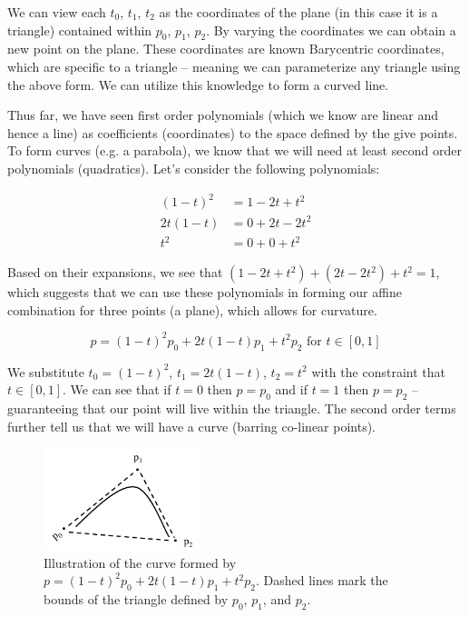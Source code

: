 \documentclass[12pt,letterpaper]{article}
\begin{document}
We can view each $t_{0}$, $t_{1}$, $t_{2}$ as the coordinates of the plane (in this case it is a triangle) contained within $p_{0}$, $p_{1}$, $p_{2}$. By varying the coordinates we can obtain a new point on the plane. These coordinates are known Barycentric coordinates, which are specific to a triangle -- meaning we can parameterize any triangle using the above form. We can utilize this knowledge to form a curved line.

Thus far, we have seen first order polynomials (which we know are linear and hence a line) as coefficients (coordinates) to the space defined by the give points. To form curves (e.g. a parabola), we know that we will need at least second order polynomials (quadratics). Let's consider the following polynomials:

\begin{equation}
    \begin{aligned}
    	(1 - t)^{2} &= 1 - 2t + t^{2} \\
    	2t(1-t) &= 0 + 2t - 2t^{2} \\
    	t^{2} &= 0 + 0 + t^{2}
    \end{aligned}
\end{equation}

Based on their expansions, we see that $(1 - 2t + t^2) + (2t - 2t^2) + t^2 = 1$, which suggests that we can use these polynomials in forming our affine combination for three points (a plane), which allows for curvature. 

\begin{equation}
    p = (1 - t)^{2}p_{0} + 2t(1-t)p_{1} + t^{2}p_{2} \text{ for } t \in [0, 1]
\end{equation}

We substitute $t_{0} = (1 - t)^{2}$, $t_{1} = 2t(1-t)$, $t_{2} = t^{2}$ with the constraint that $t \in [0, 1]$. We can see that if $t = 0$ then $p = p_{0}$ and if $t = 1$ then $p = p_{2}$ -- guaranteeing that our point will live within the triangle. The second order terms further tell us that we will have a curve (barring co-linear points).

\begin{figure}[!h]
    \begin{center}
        \includegraphics[width=0.40\textwidth]{figures/01_curve_3}
    \end{center}
    \caption{Illustration of the curve formed by $p = (1 - t)^{2}p_{0} + 2t(1-t)p_{1} + t^{2}p_{2}$. Dashed lines mark the bounds of the triangle defined by $p_{0}$, $p_{1}$, and $p_{2}$.}
\end{figure}
\end{document}
